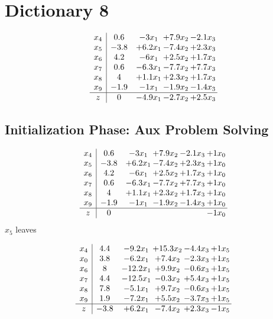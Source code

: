 \documentclass[12pt]{article}
\begin{document}
\section{Dictionary 8}
\[\begin{array}{c| c c@{\hskip 2pt} c@{\hskip 2pt} c@{\hskip 2pt} }
 x_{4}   &  0.6 & -3 x_{1} & + 7.9 x_{2} & -2.1 x_{3}\\
 x_{5}   &  -3.8 & + 6.2 x_{1} & -7.4 x_{2} & + 2.3 x_{3}\\
 x_{6}   &  4.2 & -6 x_{1} & + 2.5 x_{2} & + 1.7 x_{3}\\
 x_{7}   &  0.6 & -6.3 x_{1} & -7.7 x_{2} & + 7.7 x_{3}\\
 x_{8}   &  4 & + 1.1 x_{1} & + 2.3 x_{2} & + 1.7 x_{3}\\
 x_{9}   &  -1.9 & -1 x_{1} & -1.9 x_{2} & -1.4 x_{3}\\
\hline
z    &  0 & -4.9 x_{1} & -2.7 x_{2} & + 2.5 x_{3}\\
\end{array}\]
\subsection{Initialization Phase: Aux Problem Solving}
\[\begin{array}{c| c c@{\hskip 2pt} c@{\hskip 2pt} c@{\hskip 2pt} c@{\hskip 2pt} }
 x_{4}   &  0.6 & -3 x_{1} & + 7.9 x_{2} & -2.1 x_{3} & + 1 x_{0}\\
 x_{5}   &  -3.8 & + 6.2 x_{1} & -7.4 x_{2} & + 2.3 x_{3} & + 1 x_{0}\\
 x_{6}   &  4.2 & -6 x_{1} & + 2.5 x_{2} & + 1.7 x_{3} & + 1 x_{0}\\
 x_{7}   &  0.6 & -6.3 x_{1} & -7.7 x_{2} & + 7.7 x_{3} & + 1 x_{0}\\
 x_{8}   &  4 & + 1.1 x_{1} & + 2.3 x_{2} & + 1.7 x_{3} & + 1 x_{0}\\
 x_{9}   &  -1.9 & -1 x_{1} & -1.9 x_{2} & -1.4 x_{3} & + 1 x_{0}\\
\hline
z    &  0  &    &    &   & -1 x_{0}\\
\end{array}\]
$ x_{5} $ leaves 

 \[\begin{array}{c| c c@{\hskip 2pt} c@{\hskip 2pt} c@{\hskip 2pt} c@{\hskip 2pt} }
 x_{4}   &  4.4 & -9.2 x_{1} & + 15.3 x_{2} & -4.4 x_{3} & + 1 x_{5}\\
 x_{0}   &  3.8 & -6.2 x_{1} & + 7.4 x_{2} & -2.3 x_{3} & + 1 x_{5}\\
 x_{6}   &  8 & -12.2 x_{1} & + 9.9 x_{2} & -0.6 x_{3} & + 1 x_{5}\\
 x_{7}   &  4.4 & -12.5 x_{1} & -0.3 x_{2} & + 5.4 x_{3} & + 1 x_{5}\\
 x_{8}   &  7.8 & -5.1 x_{1} & + 9.7 x_{2} & -0.6 x_{3} & + 1 x_{5}\\
 x_{9}   &  1.9 & -7.2 x_{1} & + 5.5 x_{2} & -3.7 x_{3} & + 1 x_{5}\\
\hline
z    &  -3.8 & + 6.2 x_{1} & -7.4 x_{2} & + 2.3 x_{3} & -1 x_{5}\\
\end{array}\]
\end{document}
